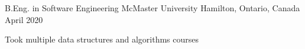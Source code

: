 


\begin{cventries}


\cventry
{B.Eng. in Software Engineering} %
{McMaster University} %
{Hamilton, Ontario, Canada} %
{April 2020} %
{ %
\begin{cvitems}
\item {Took multiple data structures and algorithms courses}
\end{cvitems}
}


\end{cventries}
